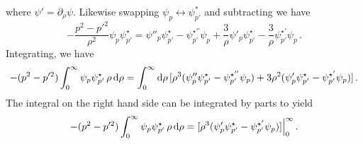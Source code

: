 \documentclass{brownthesis}
\def\dd{{\rm d}}
\begin{document}
where $\psi'=\partial_{\rho}\psi$. Likewise swapping $\psi_{p}\leftrightarrow\psi_{p'}^{*}$
and subtracting we have
\[
-\frac{p^{2}-p'^{2}}{\rho^{2}}\psi_{p}\psi_{p'}^{\star}=\psi''_{p}\psi_{p'}^{\star}-\psi_{p'}^{\star''}\psi_{p}+\frac{3}{\rho}\psi'_{p}\psi_{p'}^{\star}-\frac{3}{\rho}\psi_{p'}^{\star'}\psi_{p}\,.
\]
Integrating, we have
\[
-(p^{2}-p'^{2})\int_{0}^{\infty}\psi_{p}\psi_{p'}^{\star}\,\rho\,\dd\rho=\int_{0}^{\infty}\dd\rho\,[\rho^{3}(\psi''_{p}\psi_{p'}^{\star}-\psi_{p'}^{\star''}\psi_{p})+3\rho^{2}(\psi'_{p}\psi_{p'}^{\star}-\psi_{p'}^{\star'}\psi_{p})]\,.
\]
The integral on the right hand side can be integrated by parts to
yield
\begin{equation}
-(p^{2}-p'^{2})\int_{0}^{\infty}\psi_{p}\psi_{p'}^{\star}\,\rho\,\dd\rho=[\rho^{3}(\psi'_{p}\psi_{p'}^{\star}-\psi_{p'}^{\star'}\psi_{p})]\Big|_{0}^{\infty}\,.\label{eq:norm-int}
\end{equation}
\end{document}
